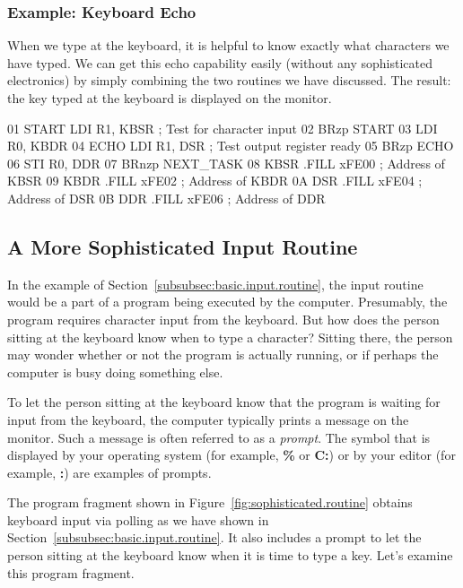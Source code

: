 \documentclass{patt}
\begin{document}
\subsubsection{Example: Keyboard Echo}
\label{subsec:keyboard.echo}

When we type at the keyboard, it is helpful to know exactly what
characters we have typed. We can get this echo capability easily
(without any sophisticated electronics) by simply combining the two
routines we have discussed.  The result: the key typed at the keyboard is
displayed on the monitor.

\begin{colorverbatim}
01     START   LDI     R1, KBSR    ; Test for character input
02             BRzp    START
03             LDI     R0, KBDR
04     ECHO    LDI     R1, DSR     ; Test output register ready
05             BRzp    ECHO
06             STI     R0, DDR
07             BRnzp   NEXT_TASK
08    KBSR    .FILL   xFE00       ; Address of KBSR
09    KBDR    .FILL   xFE02       ; Address of KBDR
0A    DSR     .FILL   xFE04       ; Address of DSR
0B    DDR     .FILL   xFE06       ; Address of DDR
\end{colorverbatim}

\subsection{A More Sophisticated Input Routine}
\label{subsec:sophisticated.routine}

In the example of Section~\ref{subsubsec:basic.input.routine}, the
input routine would be a part of a program being executed by the
computer.  Presumably, the program requires character input from the
keyboard.  But how does the person sitting at the keyboard know when
to type a character?  Sitting there, the person may wonder whether or
not the program is actually running, or if perhaps the computer is
busy doing something else.

To let the person sitting at the keyboard know that the program is
waiting for input from the keyboard, the computer typically prints a
message on the monitor. Such a message is often referred to as a {\em
  prompt}. The symbol that is  displayed by your
operating system (for example, {\bf \%} or {\bf C:}) or by your editor
(for example, {\bf :}) are examples of prompts.

The program fragment shown in Figure~\ref{fig:sophisticated.routine}
obtains keyboard input via polling as we have shown in
Section~\ref{subsubsec:basic.input.routine}. It also includes
a prompt to let the person sitting at the keyboard know when it is
time to type a key.  Let's examine this program fragment.
\end{document}
